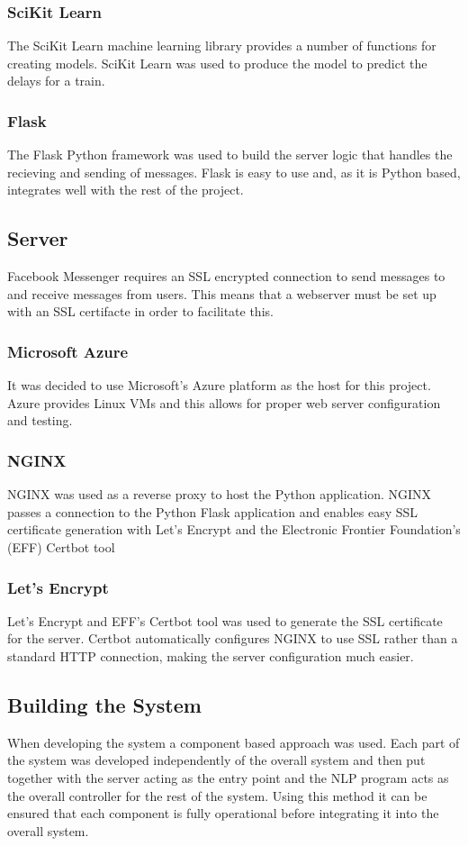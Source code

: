 \documentclass[12pt,a4paper]{article}
\begin{document}
    \subsubsection{SciKit Learn}
    The SciKit Learn machine learning library provides a number of functions for creating models. SciKit Learn was used to produce the model to predict the delays for a train.
    \subsubsection{Flask}
    The Flask Python framework was used to build the server logic that handles the recieving and sending of messages. Flask is easy to use and, as it is Python based, integrates well with the rest of the project.
    \subsection{Server}
    \label{}
    Facebook Messenger requires an SSL encrypted connection to send messages to and receive messages from users. This means that a webserver must be set up with an SSL certifacte in order to facilitate this.
    \subsubsection{Microsoft Azure}
    It was decided to use Microsoft's Azure platform as the host for this project. Azure provides Linux VMs and this allows for proper web server configuration and testing.
    \subsubsection{NGINX}
    NGINX was used as a reverse proxy to host the Python application. NGINX passes a connection to the Python Flask application and enables easy SSL certificate generation with Let's Encrypt and the Electronic Frontier Foundation's (EFF) Certbot tool %
    \subsubsection{Let's Encrypt}
    Let's Encrypt and EFF's Certbot tool was used to generate the SSL certificate for the server. Certbot automatically configures NGINX to use SSL rather than a standard HTTP connection, making the server configuration much easier.
    
    \subsection{Building the System}
    When developing the system a component based approach was used. Each part of the system was developed independently of the overall system and then put together with the server acting as the entry point and the NLP program acts as the overall controller for the rest of the system. Using this method it can be ensured that each component is fully operational before integrating it into the overall system.
    
\end{document}
